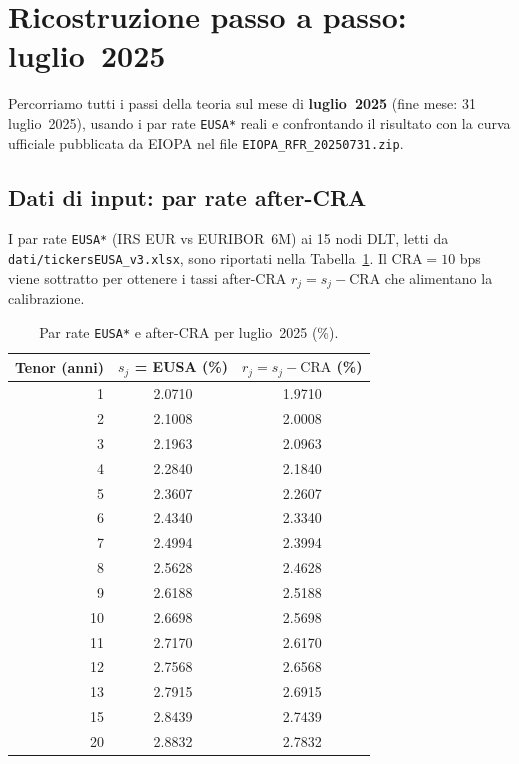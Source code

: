 \documentclass[11pt,a4paper]{article}
\theoremstyle{plain}
\theoremstyle{definition}
\theoremstyle{remark}
\newcommand{\CRA}{\ensuremath{\mathrm{CRA}}}
\begin{document}
\section{Ricostruzione passo a passo: luglio~2025}
\label{sec:ricostruzione}

Percorriamo tutti i passi della teoria sul mese di \textbf{luglio~2025} (fine mese:
31 luglio~2025), usando i par rate \texttt{EUSA*} reali e confrontando il risultato
con la curva ufficiale pubblicata da EIOPA nel file \texttt{EIOPA\_RFR\_20250731.zip}.

\subsection{Dati di input: par rate after-CRA}

I par rate \texttt{EUSA*} (IRS EUR vs EURIBOR~6M) ai 15 nodi DLT, letti da
\texttt{dati/tickersEUSA\_v3.xlsx}, sono riportati nella Tabella~\ref{tab:input-jul}.
Il $\CRA = 10$ bps viene sottratto per ottenere i tassi after-CRA $r_j = s_j - \CRA$
che alimentano la calibrazione.

\begin{table}[H]
\centering\small
\caption{Par rate \texttt{EUSA*} e after-CRA per luglio~2025 (\%).}
\label{tab:input-jul}
\renewcommand{\arraystretch}{1.15}
\begin{tabular}{rcc}
\toprule
\textbf{Tenor} (anni) & $s_j$ = EUSA (\%) & $r_j = s_j - \CRA$ (\%)\\
\midrule
 1  & 2.0710 & 1.9710\\
 2  & 2.1008 & 2.0008\\
 3  & 2.1963 & 2.0963\\
 4  & 2.2840 & 2.1840\\
 5  & 2.3607 & 2.2607\\
 6  & 2.4340 & 2.3340\\
 7  & 2.4994 & 2.3994\\
 8  & 2.5628 & 2.4628\\
 9  & 2.6188 & 2.5188\\
10  & 2.6698 & 2.5698\\
11  & 2.7170 & 2.6170\\
12  & 2.7568 & 2.6568\\
13  & 2.7915 & 2.6915\\
15  & 2.8439 & 2.7439\\
20  & 2.8832 & 2.7832\\
\bottomrule
\end{tabular}
\end{table}
\end{document}
